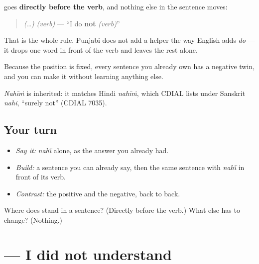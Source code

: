 \begin{cousinweb}
\textbf{} goes \textbf{directly before the verb}, and nothing else in the sentence moves:

\begin{quote}
 \emph{(…)} \textbf{} \emph{(verb)} — \textquotedblleft{}I do \textbf{not} \emph{(verb)}\textquotedblright{}
\end{quote}

That is the whole rule. Punjabi does not add a helper the way English adds \emph{do} — it drops one word in front of the verb and leaves the rest alone.

Because the position is fixed, every sentence you already own has a negative twin, and you can make it without learning anything else.

\emph{Nahīṁ} is inherited: it matches Hindi \emph{nahīṁ}, which CDIAL lists under Sanskrit \emph{nahi}, \textquotedblleft{}surely not\textquotedblright{} (CDIAL 7035).
\end{cousinweb}

\subsection*{Your turn}
\begin{itemize}
\raggedright
  \item \emph{Say it:} \emph{nahī̃} alone, as the answer you already had.
  \item \emph{Build:} a sentence you can already say, then the same sentence with \emph{nahī̃} in front of its verb.
  \item \emph{Contrast:} the positive and the negative, back to back.
\end{itemize}

\begin{tcolorbox}[breakable,colback=teal!4,colframe=teal!35!black,title={Before you move on}]
Where does \textbf{} stand in a sentence? (Directly before the verb.) What else has to change? (Nothing.)
\end{tcolorbox}
\section[\texorpdfstring{\pa{ਮੈਨੂੰ} \pa{ਸਮਝ} \pa{ਨਹੀਂ} \pa{ਆਈ} (mainū̃ samajh nahī̃ āī)}{ਮੈਨੂੰ ਸਮਝ ਨਹੀਂ ਆਈ (mainū̃ samajh nahī̃ āī)}]{    — I did not understand}

\label{lesson:PA-C37-samajh-nahin}



